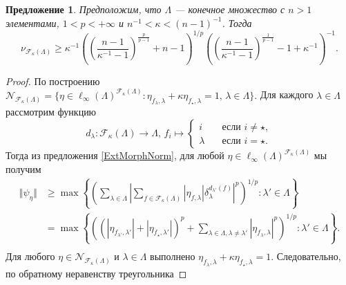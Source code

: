 \documentclass[12pt]{article}
\newtheorem{proposition}[theorem]{Предложение}
\begin{document}
\begin{proposition}\label{ExtMorphsNormLwrBnd}
    Предположим, что $\Lambda$ --- конечное множество с $n > 1$ 
    элементами, $1 < p < +\infty$ и $n^{-1} < \kappa < (n-1)^{-1}$. Тогда
    \[
        \nu_{\mathcal{F}_{\kappa}(\Lambda)}
        \geq 
        \kappa^{-1}
        \left(
            \left(\frac{n-1}{\kappa^{-1}-1}\right)^{\frac{p}{p-1}}+n-1
        \right)^{1/p}
        \left(
            \left(\frac{n-1}{\kappa^{-1}-1}\right)^{\frac{1}{p-1}}-1+\kappa^{-1}
        \right)^{-1}.
    \]
\end{proposition}
\begin{proof}
    По построению
    $
        \mathcal{N}_{\mathcal{F}_{\kappa}(\Lambda)}=\{
            \eta\in\ell_\infty(\Lambda)^{\mathcal{F}_{\kappa}(\Lambda)}:
            \eta_{f_\lambda,\lambda}+\kappa \eta_{f_\star, \lambda}=1,\, 
            \lambda\in\Lambda
        \}.
    $
    Для каждого $\lambda\in\Lambda$ рассмотрим функцию
    \[
        d_\lambda:\mathcal{F}_\kappa(\Lambda)\to\Lambda,\,
        f_i\mapsto
        \begin{cases}
            i\quad &\text{если } i\neq \star,\\
            \lambda\quad &\text{если } i=\star.
        \end{cases}
    \]
    Тогда из предложения \ref{ExtMorphNorm}, для 
    любой $\eta\in\ell_\infty(\Lambda)^{\mathcal{F}_{\kappa}(\Lambda)}$ мы 
    получим
    \[
    \begin{aligned}
        \Vert\psi_{\eta}\Vert
        &\geq\max\left\{
            \left(\sum_{\lambda\in\Lambda}
                \left|
                    \sum_{f\in\mathcal{F}_{\kappa}(\Lambda)} 
                        |\eta_{f,\lambda}|\delta_{\lambda}^{d_{\lambda'}(f)}
                \right|^p
            \right)^{1/p}:
            \lambda'\in\Lambda
        \right\} \\
        &=\max\left\{
            \left(
                (|\eta_{f_{\lambda'},\lambda'}|+|\eta_{f_\star,\lambda'}|)^p
                +
                \sum_{\lambda\in\Lambda,\lambda\neq \lambda'} 
                    |\eta_{f_\lambda,\lambda}|^p
            \right)^{1/p}:
            \lambda'\in\Lambda
        \right\}. \\
    \end{aligned}
    \]
    Для любого $\eta\in\mathcal{N}_{\mathcal{F}_{\kappa}(\Lambda)}$ 
    и $\lambda\in\Lambda$ 
    выполнено $\eta_{f_\lambda,\lambda}+\kappa \eta_{f_\star, \lambda}=1$. 
    Следовательно, по обратному неравенству треугольника

\end{proof}
\end{document}
